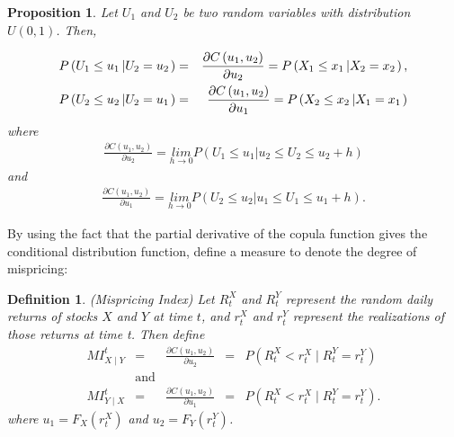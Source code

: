 \documentclass[a4paper]{article}
\newtheorem{proposition}{Proposition}
\newtheorem{definition}{Definition}
\begin{document}
	\begin{proposition}
		Let $U_{1}$ and $U_{2}$ be two random variables with distribution $U(0,1)$. Then,

	\begin{eqnarray*}
		P\left( U_{1}\leq u_{1}\left\vert U_{2}=u_{2}\right. \right)  &=&\frac{%
			\partial C\left( u_{1},u_{2}\right) }{\partial u_{2}}=P\left( X_{1}\leq
		x_{1}\left\vert X_{2}=x_{2}\right. \right) , \\
		P\left( U_{2}\leq u_{2}\left\vert U_{2}=u_{1}\right. \right)  &=&\frac{%
			\partial C\left( u_{1},u_{2}\right) }{\partial u_{1}}=P\left( X_{2}\leq
		x_{2}\left\vert X_{1}=x_{1}\right. \right) 
	\end{eqnarray*}
	where
	\begin{equation}
	\begin{aligned}
	\frac{\partial C\left( u_{1},u_{2}\right) }{\partial u_{2}}=\underset{h\rightarrow 0}{lim}P\left( U_{1}\leq u_{1}\left\vert
	u_{2}\leq U_{2}\leq u_{2}+h\right. \right)
	\end{aligned}
	\label{eq:eq08}
	\end{equation}
	and
	\begin{equation}
	\begin{aligned}
	\frac{\partial C\left( u_{1},u_{2}\right) }{\partial u_{1}}=\underset{h\rightarrow 0}{lim}P\left( U_{2}\leq u_{2}\left\vert
	u_{1}\leq U_{1}\leq u_{1}+h\right. \right).
	\end{aligned}
	\label{eq:eq09}
	\end{equation}
		\end{proposition}
	
	By using the fact that the partial derivative of the copula function gives the conditional distribution function, \citet*{xie14} define a measure to denote the degree of mispricing:
	
	\vspace{0.6cm}
	
	\begin{definition}
		(Mispricing Index) Let $R_{t}^{X}$ and $R_{t}^{Y}$ represent the random daily returns of stocks $X$ and $Y$ at time $t$, and $r_{t}^{X}$ and $r_{t}^{Y}$ represent
		the realizations of those returns at time t. Then define
		\begin{equation}
		\begin{aligned}
		MI_{X\mid Y}^{t}& = &\frac{\partial C(u_{1},u_{2})}{\partial u_{2}} & = & P(R_{t}^{X}<r_{t}^{X}\mid R_{t}^{Y}=r_{t}^{Y}) \\
		& \text{and} & \\
		MI_{Y\mid X}^{t}& = &\frac{\partial C(u_{1},u_{2})}{\partial u_{1}}& = & P(R_{t}^{X}<r_{t}^{X}\mid R_{t}^{Y}=r_{t}^{Y}).
		\end{aligned}
		\label{eq:eq31}
		\end{equation}
		where $u_{1}=F_{X}\left( r_{t}^{X}\right) $ and $u_{2}=F_{Y}\left( r_{t}^{Y}\right) $.

\end{definition}
	
\end{document}
